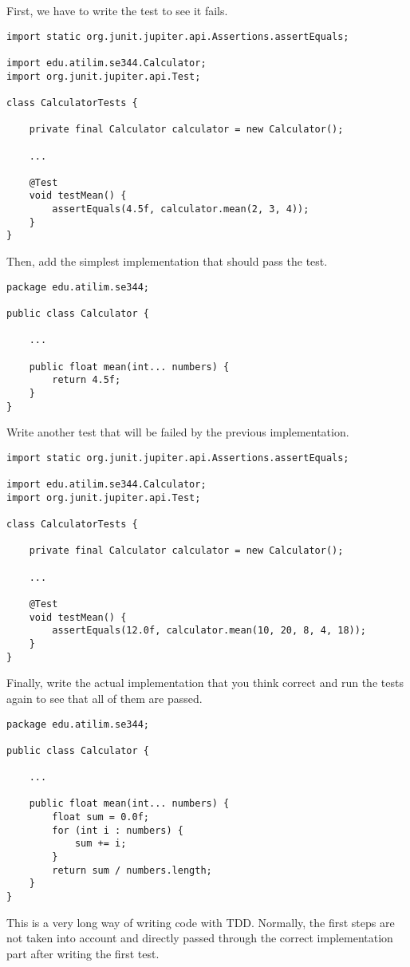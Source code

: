 \begin{solution}
    First, we have to write the test to see it fails.
    \begin{lstlisting}[caption={A unit test to testing the mean method of the Calculator class.}]
import static org.junit.jupiter.api.Assertions.assertEquals;

import edu.atilim.se344.Calculator;
import org.junit.jupiter.api.Test;

class CalculatorTests {

    private final Calculator calculator = new Calculator();

    ...
    
    @Test
    void testMean() {
        assertEquals(4.5f, calculator.mean(2, 3, 4));
    }
}
    \end{lstlisting}
    Then, add the simplest implementation that should pass the test.
    \begin{lstlisting}[caption={The simplest implementation to pass the test.}]
package edu.atilim.se344;

public class Calculator {
    
    ...
    
    public float mean(int... numbers) {
        return 4.5f;
    }
}
    \end{lstlisting}
    Write another test that will be failed by the previous implementation.
    \begin{lstlisting}[caption={Another test that invalidates the previous implementation.}]
import static org.junit.jupiter.api.Assertions.assertEquals;

import edu.atilim.se344.Calculator;
import org.junit.jupiter.api.Test;

class CalculatorTests {

    private final Calculator calculator = new Calculator();

    ...
    
    @Test
    void testMean() {
        assertEquals(12.0f, calculator.mean(10, 20, 8, 4, 18));
    }
}
    \end{lstlisting}
    Finally, write the actual implementation that you think correct and run the tests again to see that all of them are passed.
    \begin{lstlisting}[caption={A correct implementation of the mean operation.}]
package edu.atilim.se344;

public class Calculator {
    
    ...
    
    public float mean(int... numbers) {
        float sum = 0.0f;
        for (int i : numbers) {
            sum += i;
        }
        return sum / numbers.length;
    }
}
    \end{lstlisting}
    This is a very long way of writing code with TDD. Normally, the first steps are not taken into account and directly passed through the correct implementation part after writing the first test.
\end{solution}

